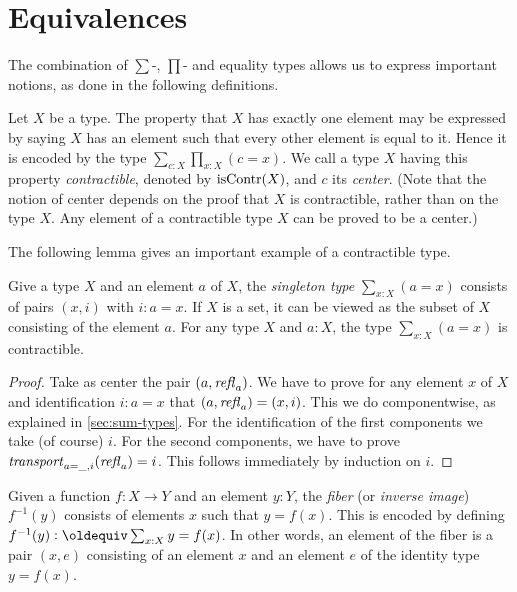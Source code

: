 \section{Equivalences}\label{sec:equivalence}


The combination of $\sum$-, $\prod$- and equality types allows
us to express important notions, as done in the following
definitions.

\begin{definition}
\label{def:contractible}
Let $X$ be a type. 
The property that $X$ has exactly one element may be expressed by saying $X$ has an element such that every other element is
equal to it.  Hence it is encoded by the type $\sum_{c:X} \prod_{x:X} (c=x)$.
We call a type $X$ having this property \emph{contractible}, 
denoted by $\mathrm{isContr}(X)$, and $c$ its \emph{center}. 
(Note that the notion of center depends on the proof that $X$
is contractible, rather than on the type $X$. 
Any element of a contractible type $X$ can be proved to be a center.) 
\end{definition}

The following lemma gives an important example of a contractible type.
\begin{lemma}\label{lem:thepathspaceiscontractible}
Give a type $X$ and an element $a$ of $X$, 
the \emph{singleton type} $\sum_{x:X} (a=x)$
consists of pairs $(x,i)$ with $i: a=x$. If $X$ is a set, it 
can be viewed as the subset of $X$ consisting of the element $a$.
For any type $X$ and $a:X$, the type $\sum_{x:X} (a=x)$ is contractible.
\end{lemma}
\begin{proof}
Take as center the pair $(a,\mathop{{\it refl}_{a}})$. We have
to prove for any element $x$ of $X$ and identification
$i: a=x$ that $(a,\mathop{{\it refl}_{a}}) = (x,i)$. This we do componentwise,
as explained in \cref{sec:sum-types}. For the identification of
the first components we take (of course) $i$. For the second
components, we have to prove $\mathord{\mathit{transport}}_{a=\_,i}(\mathop{{\it refl}_{a}})= i$.
This follows immediately by induction on $i$.
\end{proof}

\begin{definition}
\label{def:fiber}
Given a function $f : X \to Y$ and an element $y:Y$, 
the \emph{fiber} (or \emph{inverse image}) $f^{-1}(y)$ consists 
of elements $x$ such that $y = f(x)$.  
This is encoded by defining $f^{-1}(y) \defeq \sum_{x:X} y = f(x)$.  
In other words, an element of the fiber is a pair $(x,e)$ consisting
of an element $x$ and an element $e$ of the identity type $y = f(x)$.
\end{definition}

